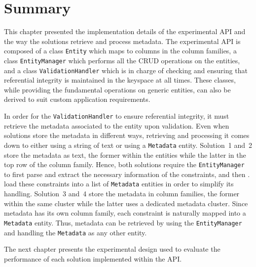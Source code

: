  
	


% 
% 
% 
% 
%  
% 
%   

\section{Summary}\label{s:Implementation-summary}

This chapter presented the implementation details of the experimental \ac{API}
and the way the solutions retrieve and process metadata. The experimental
\ac{API} is composed of a class \texttt{Entity} which maps to columns in the
column families, a class \texttt{EntityManager} which  performs all the
\ac{CRUD} operations on the entities, and a class \texttt{ValidationHandler}
which is in charge of checking and ensuring that referential integrity is
maintained in the keyspace at all times. These classes, while providing the fundamental
operations on generic entities, can also be derived to suit custom
application requirements. 

In order for the \texttt{ValidationHandler} to ensure referential integrity, it
must retrieve the metadata associated to the entity upon validation.  Even when
solutions store the metadata in different ways, retrieving and processing it comes down to  either using a string of text or
using a \texttt{Metadata} entity.
Solution~1 and~2 store the  metadata as text, the former  within the
entities while the latter in the top row of the column family. Hence,
both solutions require the \texttt{EntityManager} to
first parse and extract the necessary information of the constraints, and then .
load these constraints into a list of \texttt{Metadata} entities in order to
simplify its handling.
  Solution~3 and~4 store the metadata in column families, the former within the
  same cluster while the latter uses a dedicated metadata cluster. Since
  metadata has its own column family, each constraint is naturally mapped into
  a \texttt{Metadata} entity. Thus, metadata can be   retrieved by using
  the \texttt{EntityManager} and handling the \texttt{Metadata} as any other
  entity. 

The next chapter presents the experimental design used to evaluate  the
performance of each solution implemented within the \ac{API}.



